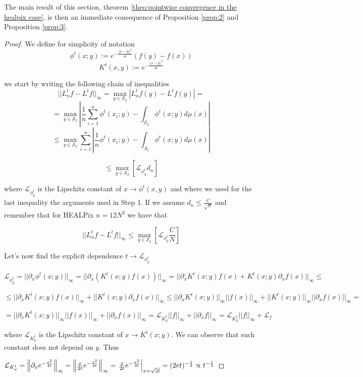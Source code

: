 The main result of this section, theorem  \ref{theo:pointwise convergence in the healpix case}, is then an immediate consequence of Proposition \ref{prop:2} and Proposition \ref{prop:3}.


\begin{proof}
	
	We define for simplicity of notation
	$$\phi^t(x;y) := e^{-\frac{||x-y||^2}{4t}}\left(f(y)-f(x)\right)$$
	$$K^t(x,y) :=  e^{-\frac{||x-y||^2}{4t}}$$

	
	we start by writing the following chain of inequalities
	$$||L_n^tf-L^tf||_\infty = \max _{y\in \mathcal S_2} \left|L_n^tf(y)-L^tf(y)\right|=$$
	$$= \max _{y\in \mathcal S_2} \left| \frac{1}{n} \sum_{i=1}^n \phi^t(x_i; y)- \int_{\mathcal S_2} \phi^t(x;y)d\mu(x) \right|$$
	$$\leq \max _{y\in \mathcal S_2}  \sum_{i=1}^n   \left| \frac{1}{n}  \phi^t(x_i; y)- \int_{A_i} \phi^t(x;y)d\mu(x) \right|$$

	$$\leq  \max _{y\in \mathcal S_2} \left[\mathcal L_{\phi^t_y}d_n \right]$$
	
	where $\mathcal L_{\phi^t_y}$ is the Lipschitz constant of $x \rightarrow \phi^t(x, y)$ and where we used for the last inequality the arguments used in Step 1. If we assume $d_n\leq \frac{C}{\sqrt{n}}$ and remember that for HEALPix $n=12N^2$ we have that
	
	$$||L_n^tf-L^tf||_\infty  \leq  \max _{y\in \mathcal S_2} \left[ \mathcal L_{\phi^t_y} \frac{C}{N} \right]$$
	
	Let's now find the explicit dependence $t\rightarrow \mathcal L_{\phi^t_y}$
	
	$\mathcal L_{\phi^t_y} = ||\partial_x\phi^t(x;y)||_\infty = ||\partial_x\left(K^t(x;y)f(x)\right)||_\infty = ||\partial_x K^t(x;y)f(x) + K^t(x;y)\partial_x f(x)||_\infty \leq$
	
	$ \leq ||\partial_x K^t(x;y)f(x)||_\infty + ||K^t(x;y)\partial_x f(x)||_\infty \leq  ||\partial_x K^t(x;y)||_\infty||f(x)||_\infty + ||K^t(x;y)||_\infty||\partial_x f(x)||_\infty = $
	
	$ = ||\partial_x K^t(x;y)||_\infty||f(x)||_\infty + ||\partial_x f(x)||_\infty = \mathcal L_{K^t_y} ||f||_\infty + ||\partial_xf||_\infty = \mathcal L_{K^t_y} ||f||_\infty + \mathcal L_f$
	
	where $\mathcal L_{K^t_y}$ is the Lipschitz constant of $x\rightarrow K^t(x;y)$. We can observe that such constant does not depend on $y$. Thus
	
	$\mathcal L_{K^t_y} = \left\lVert\partial_x e^{-\frac{x^2}{4t}}\right\rVert_\infty = \left\lVert\frac{x}{2t}e^{-\frac{x^2}{4t}}\right\rVert_\infty = \left. \frac{x}{2t}e^{-\frac{x^2}{4t}}\right|_{x=\sqrt{2t}}=(2et)^{-\frac{1}{2}}\propto t ^ {-\frac{1}{2}}$
	

\end{proof}
